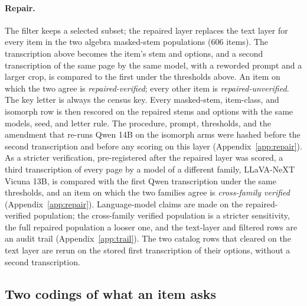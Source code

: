 \paragraph{Repair.}
The filter keeps a selected subset; the repaired layer replaces the text layer for every item in the two algebra masked-stem populations (606 items). The transcription above becomes the item's stem and options, and a second transcription of the same page by the same model, with a reworded prompt and a larger crop, is compared to the first under the thresholds above. An item on which the two agree is \emph{repaired-verified}; every other item is \emph{repaired-unverified}. The key letter is always the census key. Every masked-stem, item-class, and isomorph row is then rescored on the repaired stems and options with the same models, seed, and letter rule. The procedure, prompt, thresholds, and the amendment that re-runs Qwen 14B on the isomorph arms were hashed before the second transcription and before any scoring on this layer (Appendix~\ref{app:repair}). As a stricter verification, pre-registered after the repaired layer was scored, a third transcription of every page by a model of a different family, LLaVA-NeXT Vicuna 13B, is compared with the first Qwen transcription under the same thresholds, and an item on which the two families agree is \emph{cross-family verified} (Appendix~\ref{app:repair}). Language-model claims are made on the repaired-verified population; the cross-family verified population is a stricter sensitivity, the full repaired population a looser one, and the text-layer and filtered rows are an audit trail (Appendix~\ref{app:trail}). The two catalog rows that cleared on the text layer are rerun on the stored first transcription of their options, without a second transcription.

\subsection{Two codings of what an item asks}
\label{sec:codings-method}

